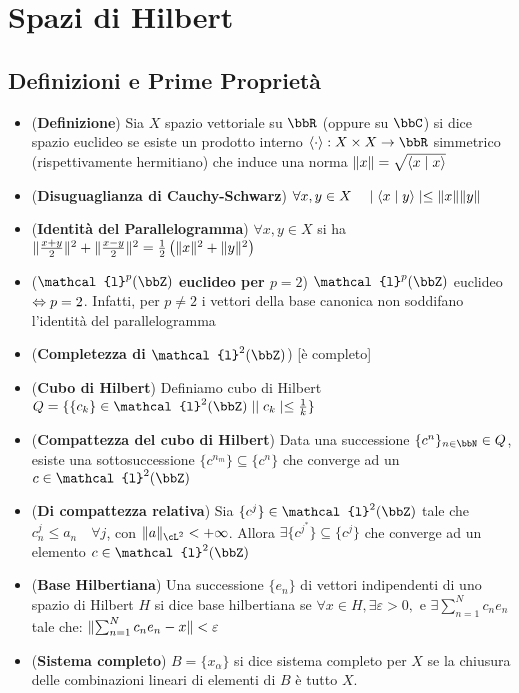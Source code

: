 \documentclass[a4paper,NoNotes,GeneralMath]{stdmdoc}
\newcommand{\cl}{\mathcal{l}}
\begin{document}
        \section*{Spazi di Hilbert}
        \subsection*{Definizioni e Prime Proprietà}
        \begin{itemize}
        \item ({\bf Definizione}) Sia $X$ spazio vettoriale su $\bbR$ (oppure su $\bbC$) si dice spazio euclideo se esiste un prodotto interno $\langle \cdot \rangle : X \times X \rar \bbR$ simmetrico (rispettivamente hermitiano) che induce una norma $\| {x} \| = \sqrt{\langle x \mid x \rangle}$
        \item ({\bf Disuguaglianza di Cauchy-Schwarz}) $\forall x, y \in X \quad \mid \langle x \mid y \rangle \mid \le \| {x} \| \| {y} \|$
        \item ({\bf Identità del Parallelogramma}) $\forall x, y \in X$ si ha $\| {\frac{x+y}{2}} \|^2 + \| {\frac{x-y}{2}} \|^2 = \frac{1}{2} \left( \| {x} \|^2 + \| {y} \|^2 \right)$
        \item ({\bf $\cl^p(\bbZ)$ euclideo per $p = 2$}) $\cl^p(\bbZ)$ euclideo $\Leftrightarrow p = 2$. Infatti, per $p \neq 2$ i vettori della base canonica non soddifano l'identità del parallelogramma
        \item ({\bf Completezza di $\cl^2(\bbZ)$}) [è completo]
        \item ({\bf Cubo di Hilbert}) Definiamo cubo di Hilbert $Q = \{ \{c_k\} \in \cl^2(\bbZ) \mid \abs{c_k} \le \frac{1}{k} \}$
        \item ({\bf Compattezza del cubo di Hilbert}) Data una successione $\{ c^n \}_{n \in \bbN} \in Q$, esiste una sottosuccessione $\{ c^{n_m} \} \subseteq \{ c^n \}$ che converge ad un $c \in \cl^2(\bbZ)$
        \item ({\bf Di compattezza relativa}) Sia $\{ c^j \} \in \cl^2(\bbZ)$ tale che $c_n^j \le a_n \quad \forall j$, con $\norm{a}_{\cL^2} < +\infty$. Allora $\exists \{ c^{j^*} \} \subseteq \{ c^j \}$ che converge ad un elemento $c \in \cl^2(\bbZ)$
        \item ({\bf Base Hilbertiana}) Una successione $\{e_n\}$ di vettori indipendenti di uno spazio di Hilbert $H$ si dice base hilbertiana se $\forall x \in H, \exists \varepsilon > 0, \text{ e } \exists \sum_{n=1}^N c_n e_n$ tale che: $\| {\sum_{n=1}^N c_n e_n - x} \| < \varepsilon$
        \item ({\bf Sistema completo}) $B = \{ x_\alpha \}$ si dice sistema completo per $X$ se la chiusura delle combinazioni lineari di elementi di $B$ è tutto $X$.

\end{itemize}
\end{document}
